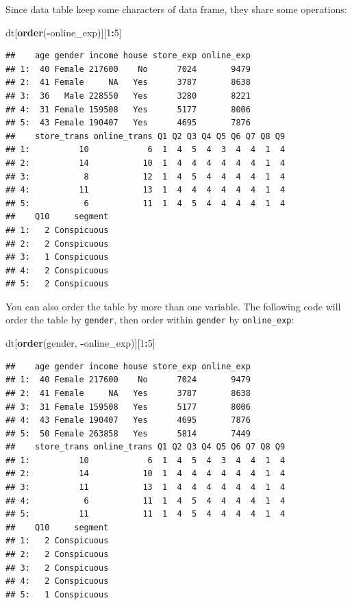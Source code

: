 \documentclass[12pt,]{krantz}
\newenvironment{Shaded}{\begin{snugshade}}{\end{snugshade}}
\newcommand{\KeywordTok}[1]{\textcolor[rgb]{0.13,0.29,0.53}{\textbf{#1}}}
\newcommand{\DecValTok}[1]{\textcolor[rgb]{0.00,0.00,0.81}{#1}}
\newcommand{\OperatorTok}[1]{\textcolor[rgb]{0.81,0.36,0.00}{\textbf{#1}}}
\newcommand{\NormalTok}[1]{#1}
\theoremstyle{definition}
\theoremstyle{definition}
\theoremstyle{definition}
\theoremstyle{remark}
\begin{document}
Since data table keep some characters of data frame, they share some
operations:

\begin{Shaded}
\begin{Highlighting}[]
\NormalTok{dt[}\KeywordTok{order}\NormalTok{(}\OperatorTok{-}\NormalTok{online_exp)][}\DecValTok{1}\OperatorTok{:}\DecValTok{5}\NormalTok{]}
\end{Highlighting}
\end{Shaded}

\begin{verbatim}
##    age gender income house store_exp online_exp
## 1:  40 Female 217600    No      7024       9479
## 2:  41 Female     NA   Yes      3787       8638
## 3:  36   Male 228550   Yes      3280       8221
## 4:  31 Female 159508   Yes      5177       8006
## 5:  43 Female 190407   Yes      4695       7876
##    store_trans online_trans Q1 Q2 Q3 Q4 Q5 Q6 Q7 Q8 Q9
## 1:          10            6  1  4  5  4  3  4  4  1  4
## 2:          14           10  1  4  4  4  4  4  4  1  4
## 3:           8           12  1  4  5  4  4  4  4  1  4
## 4:          11           13  1  4  4  4  4  4  4  1  4
## 5:           6           11  1  4  5  4  4  4  4  1  4
##    Q10     segment
## 1:   2 Conspicuous
## 2:   2 Conspicuous
## 3:   1 Conspicuous
## 4:   2 Conspicuous
## 5:   2 Conspicuous
\end{verbatim}

You can also order the table by more than one variable. The following
code will order the table by \texttt{gender}, then order within
\texttt{gender} by \texttt{online\_exp}:

\begin{Shaded}
\begin{Highlighting}[]
\NormalTok{dt[}\KeywordTok{order}\NormalTok{(gender, }\OperatorTok{-}\NormalTok{online_exp)][}\DecValTok{1}\OperatorTok{:}\DecValTok{5}\NormalTok{]}
\end{Highlighting}
\end{Shaded}

\begin{verbatim}
##    age gender income house store_exp online_exp
## 1:  40 Female 217600    No      7024       9479
## 2:  41 Female     NA   Yes      3787       8638
## 3:  31 Female 159508   Yes      5177       8006
## 4:  43 Female 190407   Yes      4695       7876
## 5:  50 Female 263858   Yes      5814       7449
##    store_trans online_trans Q1 Q2 Q3 Q4 Q5 Q6 Q7 Q8 Q9
## 1:          10            6  1  4  5  4  3  4  4  1  4
## 2:          14           10  1  4  4  4  4  4  4  1  4
## 3:          11           13  1  4  4  4  4  4  4  1  4
## 4:           6           11  1  4  5  4  4  4  4  1  4
## 5:          11           11  1  4  5  4  4  4  4  1  4
##    Q10     segment
## 1:   2 Conspicuous
## 2:   2 Conspicuous
## 3:   2 Conspicuous
## 4:   2 Conspicuous
## 5:   1 Conspicuous
\end{verbatim}
\end{document}
